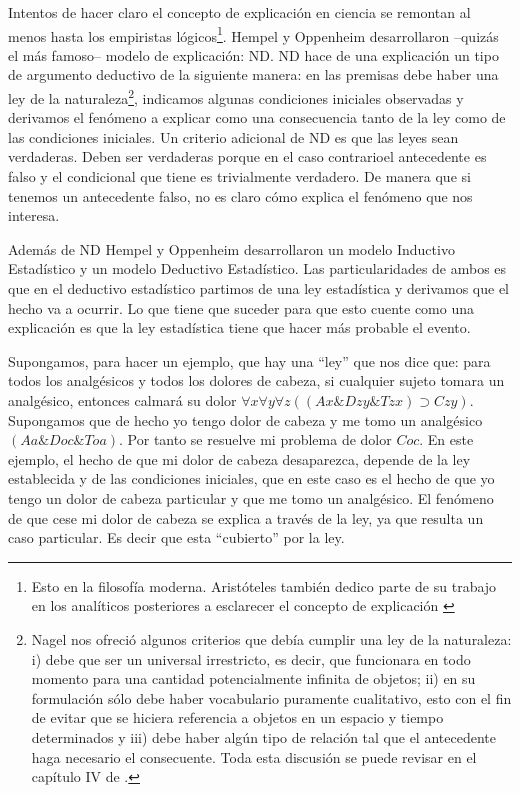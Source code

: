 Intentos de hacer claro el concepto de explicación en ciencia se remontan al menos hasta los empiristas lógicos\footnote{Esto en la filosofía moderna. Aristóteles también dedico parte de su trabajo en los analíticos posteriores a esclarecer el concepto de explicación \cite{Aristoteles2009}}. Hempel y Oppenheim desarrollaron --quizás el más famoso-- modelo de explicación: ND. ND hace de una explicación un tipo de argumento deductivo de la siguiente manera: en las premisas debe haber una ley de la naturaleza\footnote{Nagel nos ofreció algunos criterios que debía cumplir una ley de la naturaleza: i) debe que ser un universal irrestricto, es decir, que funcionara en todo momento para una cantidad potencialmente infinita de objetos; ii) en su formulación sólo debe haber vocabulario puramente cualitativo, esto con el fin de evitar que se hiciera referencia a objetos en un espacio y tiempo determinados y iii) debe haber algún tipo de relación tal que el antecedente haga necesario el consecuente. Toda esta discusión se puede revisar en el capítulo IV de \cite{Nagel2006}.}, indicamos algunas condiciones iniciales observadas y derivamos el fenómeno a explicar como una consecuencia tanto de la ley como de las condiciones iniciales. Un criterio adicional de ND es que las leyes sean verdaderas. Deben ser verdaderas porque en el caso contrarioel antecedente es falso y el condicional que tiene es trivialmente verdadero. De manera que si tenemos un antecedente falso, no es claro cómo explica el fenómeno que nos interesa.

Además de ND Hempel y Oppenheim desarrollaron un modelo Inductivo Estadístico y un modelo Deductivo Estadístico. Las particularidades de ambos es que en el deductivo estadístico partimos de una ley estadística y derivamos que el hecho va a ocurrir. Lo que tiene que suceder para que esto cuente como una explicación es que la ley estadística tiene que hacer más probable el evento.

Supongamos, para hacer un ejemplo, que hay una ``ley'' que nos dice que: para todos los analgésicos y todos los dolores de cabeza, si cualquier sujeto tomara un analgésico, entonces calmará su dolor $\forall{x}\forall{y}\forall{z}((Ax\&Dzy\&Tzx)\supset Czy)$. Supongamos que de hecho yo tengo dolor de cabeza y me tomo un analgésico $(Aa \& Doc \& Toa)$. Por tanto se resuelve mi problema de dolor $Coc$. En este ejemplo, el hecho de que mi dolor de cabeza desaparezca, depende de la ley establecida y de las condiciones iniciales, que en este caso es el hecho de que yo tengo un dolor de cabeza particular y que me tomo un analgésico. El fenómeno de que cese mi dolor de cabeza se explica a través de la ley, ya que resulta un caso particular. Es decir que esta ``cubierto'' por la ley.

